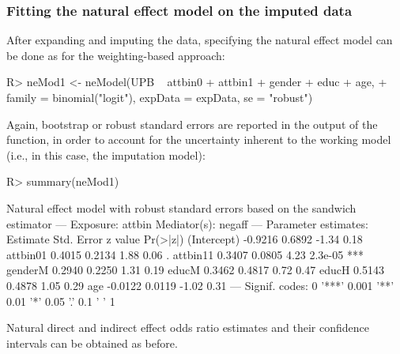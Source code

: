\documentclass[nojss]{jss}
\begin{document}
\subsubsection[]{Fitting the natural effect model on the imputed data}
After expanding and imputing the data, specifying the natural effect model can be done as for the weighting-based approach:
\begin{Schunk}
\begin{Sinput}
R> neMod1 <- neModel(UPB ~ attbin0 + attbin1 + gender + educ + age,
+    family = binomial("logit"), expData = expData, se = "robust")
\end{Sinput}
\end{Schunk}
Again, bootstrap or robust standard errors are reported in the output of the  function, in order to account for the uncertainty inherent to the working model (i.e., in this case, the imputation model):
\begin{Schunk}
\begin{Sinput}
R> summary(neMod1)
\end{Sinput}
\begin{Soutput}
Natural effect model
with robust standard errors based on the sandwich estimator
---
Exposure: attbin 
Mediator(s): negaff 
---
Parameter estimates:
            Estimate Std. Error z value Pr(>|z|)    
(Intercept)  -0.9216     0.6892   -1.34     0.18    
attbin01      0.4015     0.2134    1.88     0.06 .  
attbin11      0.3407     0.0805    4.23  2.3e-05 ***
genderM       0.2940     0.2250    1.31     0.19    
educM         0.3462     0.4817    0.72     0.47    
educH         0.5143     0.4878    1.05     0.29    
age          -0.0122     0.0119   -1.02     0.31    
---
Signif. codes:  0 '***' 0.001 '**' 0.01 '*' 0.05 '.' 0.1 ' ' 1
\end{Soutput}
\end{Schunk}
Natural direct and indirect effect odds ratio estimates and their confidence intervals can be obtained as before. 
\end{document}
